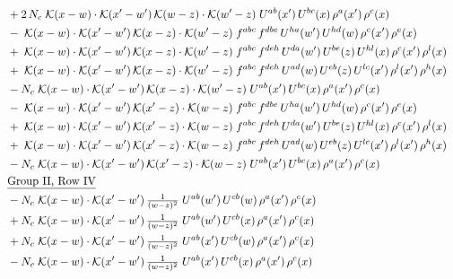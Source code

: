 \documentclass[10pt]{article}
\numberwithin{equation}{section}
\begin{document}
\begin{align}
&\quad +2\,N_c\;\mathcal{K}(x-w)\cdot\mathcal{K}(x'-w')\,\mathcal{K}(w-z)\cdot\mathcal{K}(w'-z)\;U^{ab}(x')\,U^{bc}(x)\,\rho^{a}(x')\,\rho^{c}(x)\notag\\
&\quad -\;\mathcal{K}(x-w)\cdot\mathcal{K}(x'-w')\,\mathcal{K}(x-z)\cdot\mathcal{K}(w'-z)\;f^{abc}\,f^{dbe}\,U^{ha}(w')\,U^{hd}(w)\,\rho^{c}(x')\,\rho^{e}(x)\notag\\
&\quad +\;\mathcal{K}(x-w)\cdot\mathcal{K}(x'-w')\,\mathcal{K}(x-z)\cdot\mathcal{K}(w'-z)\;f^{abc}\,f^{deh}\,U^{da}(w')\,U^{be}(z)\,U^{hl}(x)\,\rho^{c}(x')\,\rho^{l}(x)\notag\\
&\quad +\;\mathcal{K}(x-w)\cdot\mathcal{K}(x'-w')\,\mathcal{K}(x-z)\cdot\mathcal{K}(w'-z)\;f^{abc}\,f^{deh}\,U^{ad}(w)\,U^{eb}(z)\,U^{lc}(x')\,\rho^{l}(x')\,\rho^{h}(x)\notag\\
&\quad -N_c\;\mathcal{K}(x-w)\cdot\mathcal{K}(x'-w')\,\mathcal{K}(x-z)\cdot\mathcal{K}(w'-z)\;U^{ab}(x')\,U^{bc}(x)\,\rho^{a}(x')\,\rho^{c}(x)\notag\\
&\quad -\;\mathcal{K}(x-w)\cdot\mathcal{K}(x'-w')\,\mathcal{K}(x'-z)\cdot\mathcal{K}(w-z)\;f^{abc}\,f^{dbe}\,U^{ha}(w')\,U^{hd}(w)\,\rho^{c}(x')\,\rho^{e}(x)\notag\\
&\quad +\;\mathcal{K}(x-w)\cdot\mathcal{K}(x'-w')\,\mathcal{K}(x'-z)\cdot\mathcal{K}(w-z)\;f^{abc}\,f^{deh}\,U^{da}(w')\,U^{be}(z)\,U^{hl}(x)\,\rho^{c}(x')\,\rho^{l}(x)\notag\\
&\quad +\;\mathcal{K}(x-w)\cdot\mathcal{K}(x'-w')\,\mathcal{K}(x'-z)\cdot\mathcal{K}(w-z)\;f^{abc}\,f^{deh}\,U^{ad}(w)\,U^{eb}(z)\,U^{lc}(x')\,\rho^{l}(x')\,\rho^{h}(x)\notag\\
&\quad -N_c\;\mathcal{K}(x-w)\cdot\mathcal{K}(x'-w')\,\mathcal{K}(x'-z)\cdot\mathcal{K}(w-z)\;U^{ab}(x')\,U^{bc}(x)\,\rho^{a}(x')\,\rho^{c}(x)\notag\\
&\quad\underline{\text{Group II, Row IV}}\notag\\
&\quad -N_c\;\mathcal{K}(x-w)\cdot\mathcal{K}(x'-w')\,\tfrac{1}{(w-z)^{2}}\;U^{ab}(w')\,U^{cb}(w)\,\rho^{a}(x')\,\rho^{c}(x)\notag\\
&\quad +N_c\;\mathcal{K}(x-w)\cdot\mathcal{K}(x'-w')\,\tfrac{1}{(w-z)^{2}}\;U^{ab}(w')\,U^{cb}(x)\,\rho^{a}(x')\,\rho^{c}(x)\notag\\
&\quad +N_c\;\mathcal{K}(x-w)\cdot\mathcal{K}(x'-w')\,\tfrac{1}{(w-z)^{2}}\;U^{ab}(x')\,U^{cb}(w)\,\rho^{a}(x')\,\rho^{c}(x)\notag\\
&\quad -N_c\;\mathcal{K}(x-w)\cdot\mathcal{K}(x'-w')\,\tfrac{1}{(w-z)^{2}}\;U^{ab}(x')\,U^{cb}(x)\,\rho^{a}(x')\,\rho^{c}(x)\notag\\

\end{align}
\end{document}
